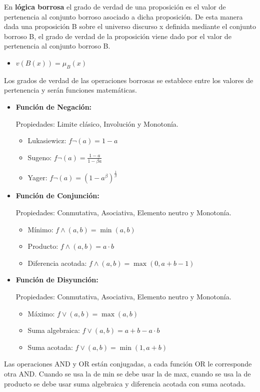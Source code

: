 \documentclass[12pt, twoside, openright]{report} %
\begin{document}
En \textbf{lógica borrosa} el grado de verdad de una proposición es el valor de pertenencia al conjunto borroso asociado a dicha proposición. De esta manera dada una proposición B sobre el universo discurso x definida mediante el conjunto borroso B, el grado de verdad de la proposición viene dado por el valor de pertenencia al conjunto borroso B.
\begin{itemize}
	\item $v(B(x)) = \mu_B(x)$
\end{itemize}

Los grados de verdad de las operaciones borrosas se establece entre los valores de pertenencia y serán funciones matemáticas.
\begin{itemize}
	\item \textbf{Función de Negación:}
	
	Propiedades: Limite clásico, Involución y Monotonía.
	\begin{itemize}
		\item Lukasiewicz: $f \neg (a)=1-a$
		\item Sugeno: $f \neg(a)=\frac{1-a}{1-\beta a}$
		\item Yager: $f \neg(a)=(1-a^\beta)^{\frac{1}{\beta}}$
	\end{itemize}
	\item \textbf{Función de Conjunción:}
	
	Propiedades: Conmutativa, Asociativa, Elemento neutro y Monotonía.
	\begin{itemize}
		\item Mínimo: $f\wedge(a, b)=\min(a, b)$
		\item Producto: $f\wedge(a, b)=a\cdot b$
		\item Diferencia acotada: $f\wedge(a, b)=\max(0, a+b-1)$
	\end{itemize}
	\item \textbf{Función de Disyunción:}
	
	Propiedades: Conmutativa, Asociativa, Elemento neutro y Monotonía.
	\begin{itemize}
		\item Máximo: $f\vee(a, b)=\max(a, b)$
		\item Suma algebraica: $f\vee(a, b)=a+b-a\cdot b$
		\item Suma acotada: $f\vee(a, b)=\min(1, a+b)$
	\end{itemize}
\end{itemize}

Las operaciones AND y OR están conjugadas, a cada función OR le corresponde otra AND. Cuando se usa la de min se debe usar la de max, cuando se usa la de producto se debe usar suma algebraica y diferencia acotada con suma acotada.
\pagebreak
\end{document}
